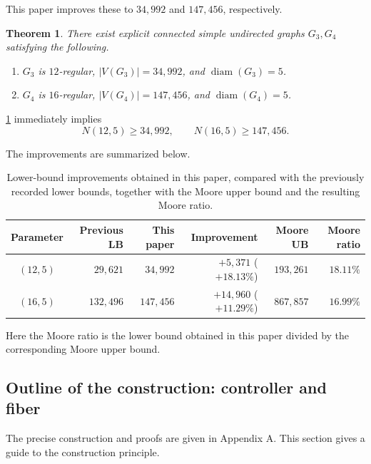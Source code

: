 \documentclass[11pt]{article}
\newtheorem{theorem}{Theorem}[section]
\theoremstyle{definition}
\theoremstyle{remark}
\providecommand{\tightlist}{\setlength{\itemsep}{0pt}\setlength{\parskip}{0pt}}
\renewcommand{\_}{\textunderscore\allowbreak}
\begin{document}
This paper improves these to \(34{,}992\) and \(147{,}456\),
respectively.

\begin{theorem}\label{thm:main}
There exist explicit connected simple undirected graphs
\(G_3,G_4\) satisfying the following.

\begin{enumerate}
\def\labelenumi{\arabic{enumi}.}
\tightlist
\item
  \(G_3\) is \(12\)-regular, \(|V(G_3)|=34{,}992\), and
  \(\operatorname{diam}(G_3)=5\).
\item
  \(G_4\) is \(16\)-regular, \(|V(G_4)|=147{,}456\), and
  \(\operatorname{diam}(G_4)=5\).
\end{enumerate}
\end{theorem}

\cref{thm:main} immediately implies \[
  N(12,5)\ge34{,}992,
  \qquad
  N(16,5)\ge147{,}456 .
\]

The improvements are summarized below.

\begin{table}[ht]
\centering
\caption{Lower-bound improvements obtained in this paper, compared with the previously recorded lower bounds, together with the Moore upper bound and the resulting Moore ratio.}
\label{tab:known}
\begin{tabular}{crrrrr}
\toprule
Parameter & Previous LB & This paper & Improvement & Moore UB & Moore ratio \\
\midrule
\((12,5)\) & \(29{,}621\) & \(34{,}992\) & \(+5{,}371\) (\(+18.13\%\)) & \(193{,}261\) & \(18.11\%\) \\
\midrule
\((16,5)\) & \(132{,}496\) & \(147{,}456\) & \(+14{,}960\) (\(+11.29\%\)) & \(867{,}857\) & \(16.99\%\) \\
\bottomrule
\end{tabular}
\end{table}

Here the Moore ratio is the lower bound obtained in this paper divided
by the corresponding Moore upper bound.

\subsection{Outline of the construction: controller and
fiber}\label{outline-of-the-construction-controller-and-fiber}

The precise construction and proofs are given in Appendix A. This
section gives a guide to the construction principle.
\end{document}
